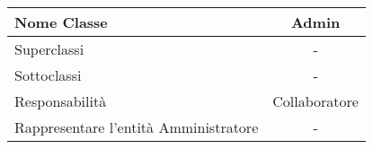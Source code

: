 
\setcounter{table}{0}
\begin{table}[H]
    \centering
    \begin{tabular}{||   l  ||  c   ||}
        \hline
        Nome Classe & Admin\\
        \hline
        Superclassi  &  - \\
        \hline
        Sottoclassi & - \\
        \hline
        \hline
         Responsabilità & Collaboratore \\
         \hline
          Rappresentare l'entità Amministratore & - \\
         \hline
    \end{tabular}
\end{table}

    
       
